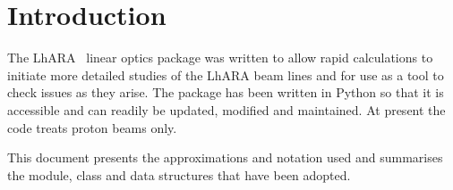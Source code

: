 \section{Introduction}

The LhARA~\cite{Aymar:2020drr,LhARA:pre-CDR} linear optics package was
written to allow rapid calculations to initiate more detailed studies
of the LhARA beam lines and for use as a tool to check issues as they
arise.
The package has been written in Python so that it is accessible and
can readily be updated, modified and maintained.
At present the code treats proton beams only.

This document presents the approximations and notation used and
summarises the module, class and data structures that have been
adopted.
